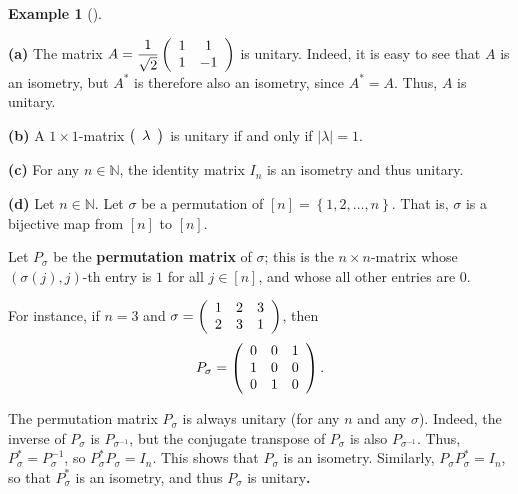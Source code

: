 \documentclass[numbers=enddot,12pt,final,onecolumn,notitlepage]{scrartcl}%
\numberwithin{exer}{subsection}
\theoremstyle{definition}
\newtheorem{exam}[theo]{Example}
\newenvironment{example}[1][]
{\begin{exam}[#1]\begin{leftbar}}
{\end{leftbar}\end{exam}}
\begin{document}
\begin{example}
\textbf{(a)} The matrix $A=\dfrac{1}{\sqrt{2}}\left(
\begin{array}
[c]{cc}%
1 & 1\\
1 & -1
\end{array}
\right)  $ is unitary. Indeed, it is easy to see that $A$ is an isometry, but
$A^{\ast}$ is therefore also an isometry, since $A^{\ast}=A$. Thus, $A$ is unitary.

\textbf{(b)} A $1\times1$-matrix $\left(
\begin{array}
[c]{c}%
\lambda
\end{array}
\right)  $ is unitary if and only if $\left\vert \lambda\right\vert =1$.

\textbf{(c)} For any $n\in\mathbb{N}$, the identity matrix $I_{n}$ is an
isometry and thus unitary.

\textbf{(d)} Let $n\in\mathbb{N}$. Let $\sigma$ be a permutation of $\left[
n\right]  =\left\{  1,2,\ldots,n\right\}  $. That is, $\sigma$ is a bijective
map from $\left[  n\right]  $ to $\left[  n\right]  $.

Let $P_{\sigma}$ be the \textbf{permutation matrix} of $\sigma$; this is the
$n\times n$-matrix whose $\left(  \sigma\left(  j\right)  ,j\right)  $-th
entry is $1$ for all $j\in\left[  n\right]  $, and whose all other entries are
$0$.

For instance, if $n=3$ and $\sigma=\left(
\begin{array}
[c]{ccc}%
1 & 2 & 3\\
2 & 3 & 1
\end{array}
\right)  $, then%
\[
P_{\sigma}=\left(
\begin{array}
[c]{ccc}%
0 & 0 & 1\\
1 & 0 & 0\\
0 & 1 & 0
\end{array}
\right)  .
\]


The permutation matrix $P_{\sigma}$ is always unitary (for any $n$ and any
$\sigma$). Indeed, the inverse of $P_{\sigma}$ is $P_{\sigma^{-1}}$, but the
conjugate transpose of $P_{\sigma}$ is also $P_{\sigma^{-1}}$. Thus,
$P_{\sigma}^{\ast}=P_{\sigma}^{-1}$, so $P_{\sigma}^{\ast}P_{\sigma}=I_{n}$.
This shows that $P_{\sigma}$ is an isometry. Similarly, $P_{\sigma}P_{\sigma
}^{\ast}=I_{n}$, so that $P_{\sigma}^{\ast}$ is an isometry, and thus
$P_{\sigma}$ is unitary\textbf{.}


\end{example}
\end{document}
